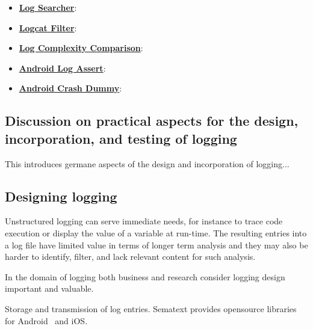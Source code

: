 \begin{itemize}
    \item \href{https://github.com/ISNIT0/log-searcher}{\textbf{Log Searcher}}:
    \item \href{https://github.com/ISNIT0/logcat-filter}{\textbf{Logcat Filter}}:
    \item \href{https://github.com/ISNIT0/log-complexity-comparison}{\textbf{Log Complexity Comparison}}:
    \item \href{https://github.com/ISNIT0/AndroidLogAssert}{\textbf{Android Log Assert}}:
    \item \href{https://github.com/ISNIT0/AndroidCrashDummy}{\textbf{Android Crash Dummy}}:
\end{itemize}



\subsection{Discussion on practical aspects for the design, incorporation, and testing of logging} \label{apx:practical-aspects-for-design-and-incorporation-of-logging}
This introduces germane aspects of the design and incorporation of logging...



\subsection{Designing logging}
Unstructured logging can serve immediate needs, for instance to trace code execution or display the value of a variable at run-time. The resulting entries into a log file have limited value in terms of longer term analysis and they may also be harder to identify, filter, and lack relevant content for such analysis.

In the domain of logging both business and research consider logging design important and valuable. 

Storage and transmission of log entries. Sematext provides opensource libraries for Android~\citep{github2020_sematext_logsene_android} and iOS.

